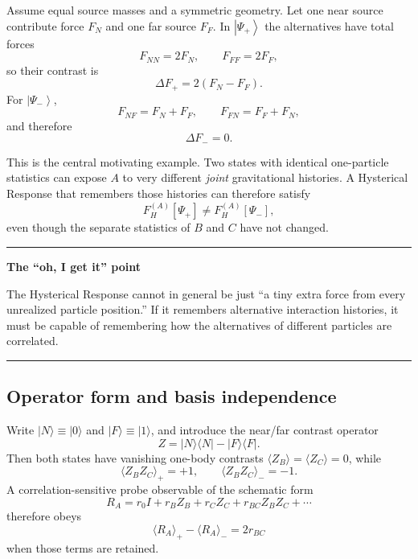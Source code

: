\documentclass[11pt]{article}
\newcommand{\ket}[1]{\left|#1\right\rangle}
\newenvironment{plainbox}[1]{\begin{center}\begin{minipage}{0.91\textwidth}\hrule\vspace{0.55em}\textbf{#1}\par\smallskip}{\vspace{0.55em}\hrule\end{minipage}\end{center}}
\begin{document}
Assume equal source masses and a symmetric geometry. Let one near source contribute force $F_N$ and one far source $F_F$. In $\ket{\Psi_+}$ the alternatives have total forces
\begin{equation}
F_{NN}=2F_N,\qquad F_{FF}=2F_F,
\end{equation}
so their contrast is
\begin{equation}
\Delta F_+=2(F_N-F_F).
\end{equation}
For $\ket{\Psi_-}$,
\begin{equation}
F_{NF}=F_N+F_F,\qquad F_{FN}=F_F+F_N,
\end{equation}
and therefore
\begin{equation}
\boxed{\Delta F_-=0.}
\end{equation}

This is the central motivating example. Two states with identical one-particle statistics can expose $A$ to very different \emph{joint} gravitational histories. A Hysterical Response that remembers those histories can therefore satisfy
\begin{equation}
\boxed{F_H^{(A)}[\Psi_+]\neq F_H^{(A)}[\Psi_-],}
\end{equation}
even though the separate statistics of $B$ and $C$ have not changed.

\begin{plainbox}{The ``oh, I get it'' point}
The Hysterical Response cannot in general be just ``a tiny extra force from every unrealized particle position.'' If it remembers alternative interaction histories, it must be capable of remembering how the alternatives of different particles are correlated.
\end{plainbox}

\subsection{Operator form and basis independence}
Write $|N\rangle\equiv|0\rangle$ and $|F\rangle\equiv|1\rangle$, and introduce the near/far contrast operator
\begin{equation}
Z=|N\rangle\langle N|-|F\rangle\langle F|.
\end{equation}
Then both states have vanishing one-body contrasts $\langle Z_B\rangle=\langle Z_C\rangle=0$, while
\begin{equation}
\boxed{\langle Z_BZ_C\rangle_{+}=+1,\qquad \langle Z_BZ_C\rangle_{-}=-1.}
\end{equation}
A correlation-sensitive probe observable of the schematic form
\begin{equation}
R_A=r_0I+r_BZ_B+r_CZ_C+r_{BC}Z_BZ_C+\cdots
\end{equation}
therefore obeys
\begin{equation}
\boxed{\langle R_A\rangle_{+}-\langle R_A\rangle_{-}=2r_{BC}}
\end{equation}
when those terms are retained.
\end{document}
